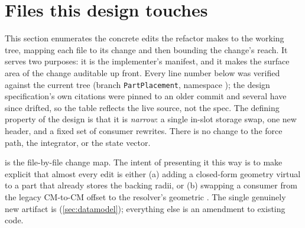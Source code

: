 \section{Files this design touches}\label{sec:files}

This section enumerates the concrete edits the refactor makes to the working tree, mapping
each file to its change and then bounding the change's reach. It serves two purposes: it is
the implementer's manifest, and it makes the surface area of the change auditable up front.
Every line number below was verified against the current tree (branch \texttt{PartPlacement},
namespace ); the design specification's own citations were pinned to an
older commit and several have since drifted, so the table reflects the live source, not the
spec. The defining property of the design is that it is \emph{narrow}: a single in-slot
storage swap, one new header, and a fixed set of consumer rewrites. There is no change to the
force path, the integrator, or the state vector.

 is the file-by-file change map. The intent of presenting it this way is to
make explicit that almost every edit is either (a) adding a closed-form geometry virtual to a
part that already stores the backing radii, or (b) swapping a consumer from the legacy
CM-to-CM offset to the resolver's geometric . The single genuinely new
artifact is  (\cref{sec:datamodel}); everything else is an
amendment to existing code.

